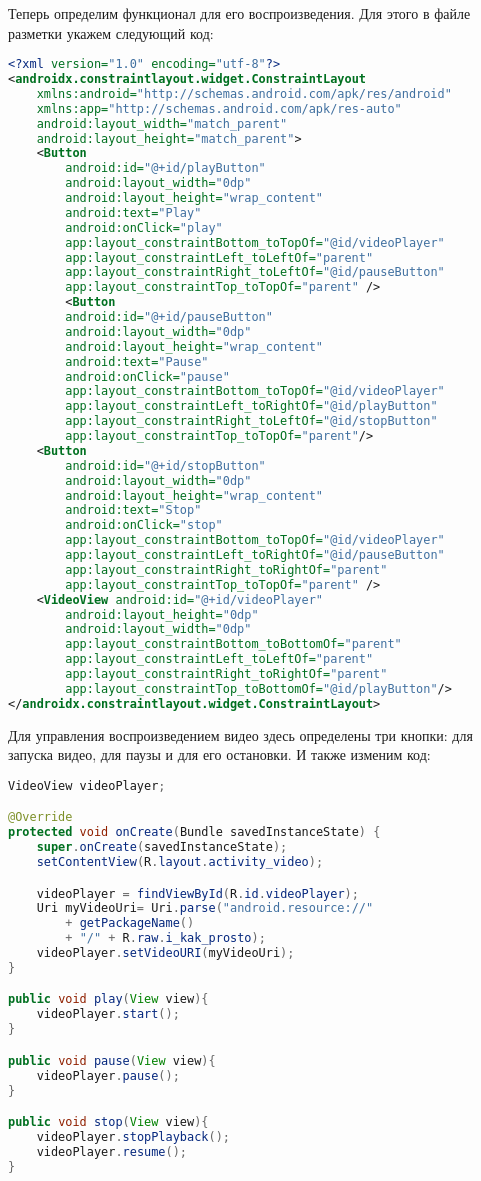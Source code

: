 Теперь определим функционал для его воспроизведения. Для этого в файле
разметки укажем следующий код:

\begin{lstlisting}[language=XML
	, label=lst:
	]
<?xml version="1.0" encoding="utf-8"?>
<androidx.constraintlayout.widget.ConstraintLayout
    xmlns:android="http://schemas.android.com/apk/res/android"
    xmlns:app="http://schemas.android.com/apk/res-auto"
    android:layout_width="match_parent"
    android:layout_height="match_parent">
    <Button
        android:id="@+id/playButton"
        android:layout_width="0dp"
        android:layout_height="wrap_content"
        android:text="Play"
        android:onClick="play"
        app:layout_constraintBottom_toTopOf="@id/videoPlayer"
        app:layout_constraintLeft_toLeftOf="parent"
        app:layout_constraintRight_toLeftOf="@id/pauseButton"
        app:layout_constraintTop_toTopOf="parent" />
        <Button
        android:id="@+id/pauseButton"
        android:layout_width="0dp"
        android:layout_height="wrap_content"
        android:text="Pause"
        android:onClick="pause"
        app:layout_constraintBottom_toTopOf="@id/videoPlayer"
        app:layout_constraintLeft_toRightOf="@id/playButton"
        app:layout_constraintRight_toLeftOf="@id/stopButton"
        app:layout_constraintTop_toTopOf="parent"/>
    <Button
        android:id="@+id/stopButton"
        android:layout_width="0dp"
        android:layout_height="wrap_content"
        android:text="Stop"
        android:onClick="stop"
        app:layout_constraintBottom_toTopOf="@id/videoPlayer"
        app:layout_constraintLeft_toRightOf="@id/pauseButton"
        app:layout_constraintRight_toRightOf="parent"
        app:layout_constraintTop_toTopOf="parent" />
    <VideoView android:id="@+id/videoPlayer"
        android:layout_height="0dp"
        android:layout_width="0dp"
        app:layout_constraintBottom_toBottomOf="parent"
        app:layout_constraintLeft_toLeftOf="parent"
        app:layout_constraintRight_toRightOf="parent"
        app:layout_constraintTop_toBottomOf="@id/playButton"/>
</androidx.constraintlayout.widget.ConstraintLayout>
\end{lstlisting}

Для управления воспроизведением видео здесь определены три кнопки: для
запуска видео, для паузы и для его остановки.
И также изменим код:

\begin{lstlisting}[language=Java
	, label=lst:
	]
VideoView videoPlayer;

@Override
protected void onCreate(Bundle savedInstanceState) {
	super.onCreate(savedInstanceState);
	setContentView(R.layout.activity_video);

	videoPlayer = findViewById(R.id.videoPlayer);
	Uri myVideoUri= Uri.parse("android.resource://"
		+ getPackageName()
		+ "/" + R.raw.i_kak_prosto);
	videoPlayer.setVideoURI(myVideoUri);
}

public void play(View view){
	videoPlayer.start();
}

public void pause(View view){
	videoPlayer.pause();
}

public void stop(View view){
	videoPlayer.stopPlayback();
	videoPlayer.resume();
}
\end{lstlisting}

